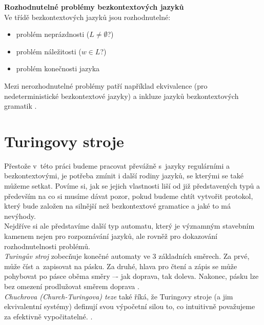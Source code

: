 \textbf{Rozhodnutelné problémy bezkontextových jazyků} \\
Ve třídě bezkontextových jazyků jsou rozhodnutelné:
\begin{itemize}
\item problém neprázdnosti ($L \neq \emptyset$?)
\item problém náležitosti ($w \in L$?)
\item problém konečnosti jazyka \cite[str. 97-98]{TIN2013}
\end{itemize}
\vspace*{\baselineskip}
Mezi nerozhodnutelné problémy patří například ekvivalence (pro nedeterministické bezkontextové jazyky) a inkluze jazyků bezkontextových gramatik 
\cite[str. 99]{TIN2013}.

\section{Turingovy stroje} \label{sec:2:ts}
Přestože v~této práci budeme pracovat převážně s~jazyky regulárními a bezkontextovými, je potřeba zmínit i další rodiny jazyků, se kterými se také 
můžeme setkat. Povíme si, jak se jejich vlastnosti liší od již představených typů a především na co si musíme dávat pozor, pokud budeme chtít 
vytvořit protokol, který bude založen na silnější než bezkontextové gramatice a jaké to má nevýhody. \\

Nejdříve si ale představíme další typ automatu, který je významným stavebním kamenem nejen pro rozpoznávání jazyků, ale rovněž pro dokazování 
rozhodnutelnosti problémů. \\

\textit{Turingův stroj} zobecňuje konečné automaty ve 3 základních směrech. Za prvé, může číst a~zapisovat na pásku. Za druhé, hlava pro čtení 
a zápis se může pohybovat po pásce oběma směry –- jak doprava, tak doleva. Nakonec, pásku lze bez omezení prodlužovat směrem doprava 
\cite[str. 119]{Meduna2014}. \\

\textit{Chuchrova (Church-Turingova) teze} také říká, že Turingovy stroje (a jim ekvivalentní systémy) definují svou výpočetní silou to, co intuitivně 
považujeme za efektivně vypočitatelné. \cite[str. 102]{TIN2013}. \\

